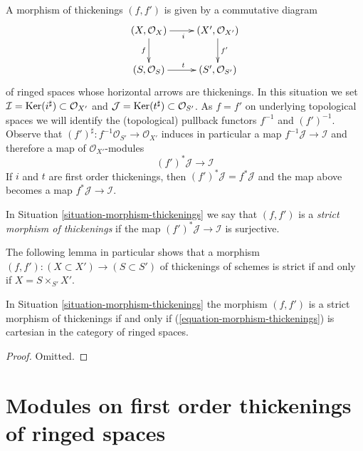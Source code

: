 \begin{situation}
\label{situation-morphism-thickenings}
A morphism of thickenings $(f, f')$ is given by a commutative diagram
\begin{equation}
\label{equation-morphism-thickenings}
\vcenter{
\xymatrix{
(X, \mathcal{O}_X) \ar[r]_i \ar[d]_f & (X', \mathcal{O}_{X'}) \ar[d]^{f'} \\
(S, \mathcal{O}_S) \ar[r]^t & (S', \mathcal{O}_{S'})
}
}
\end{equation}
of ringed spaces whose horizontal arrows are thickenings. In this
situation we set
$\mathcal{I} = \mathop{\mathrm{Ker}}(i^\sharp) \subset \mathcal{O}_{X'}$ and
$\mathcal{J} = \mathop{\mathrm{Ker}}(t^\sharp) \subset \mathcal{O}_{S'}$.
As $f = f'$ on underlying topological spaces we will identify
the (topological) pullback functors $f^{-1}$ and $(f')^{-1}$.
Observe that $(f')^\sharp : f^{-1}\mathcal{O}_{S'} \to \mathcal{O}_{X'}$
induces in particular a map $f^{-1}\mathcal{J} \to \mathcal{I}$
and therefore a map of $\mathcal{O}_{X'}$-modules
$$
(f')^*\mathcal{J} \longrightarrow \mathcal{I}
$$
If $i$ and $t$ are first order thickenings, then
$(f')^*\mathcal{J} = f^*\mathcal{J}$ and the map above becomes a
map $f^*\mathcal{J} \to \mathcal{I}$.
\end{situation}

\begin{definition}
\label{definition-strict-morphism-thickenings}
In Situation \ref{situation-morphism-thickenings} we say that $(f, f')$ is a
{\it strict morphism of thickenings}
if the map $(f')^*\mathcal{J} \longrightarrow \mathcal{I}$ is surjective.
\end{definition}

\noindent
The following lemma in particular shows that a morphism
$(f, f') : (X \subset X') \to (S \subset S')$ of
thickenings of schemes is strict if and only if $X = S \times_{S'} X'$.

\begin{lemma}
\label{lemma-strict-morphism-thickenings}
In Situation \ref{situation-morphism-thickenings} the morphism $(f, f')$
is a strict morphism of thickenings if and only if
(\ref{equation-morphism-thickenings}) is cartesian in the category
of ringed spaces.
\end{lemma}

\begin{proof}
Omitted.
\end{proof}




\section{Modules on first order thickenings of ringed spaces}
\label{section-modules-thickenings}

